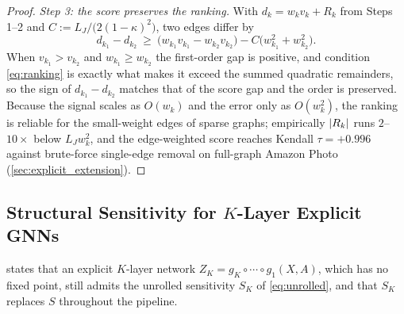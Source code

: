 \begin{proof}
\emph{Step 3: the score preserves the ranking.}
With $d_k=w_k v_k+R_k$ from Steps 1--2 and $C:=L_J/\big(2(1-\kappa)^2\big)$, two edges differ by
\begin{equation}
d_{k_1}-d_{k_2}\ \ge\ \big(w_{k_1}v_{k_1}-w_{k_2}v_{k_2}\big)-C\big(w_{k_1}^2+w_{k_2}^2\big).
\label{eq:rank-gap}
\end{equation}
When $v_{k_1}>v_{k_2}$ and $w_{k_1}\ge w_{k_2}$ the first-order gap is positive, and condition
\eqref{eq:ranking} is exactly what makes it exceed the summed quadratic remainders, so the sign of
$d_{k_1}-d_{k_2}$ matches that of the score gap and the order is preserved. Because the signal scales as
$O(w_k)$ and the error only as $O(w_k^2)$, the ranking is reliable for the small-weight edges of sparse
graphs; empirically $\left|R_k\right|$ runs $2$--$10\times$ below $L_J w_k^2$, and the edge-weighted score
reaches Kendall $\tau=+0.996$ against brute-force single-edge removal on full-graph Amazon Photo
(\cref{sec:explicit_extension}).
\end{proof}

\subsection{Structural Sensitivity for $K$-Layer Explicit GNNs}
\label{app:explicit_prop}

 states that an explicit $K$-layer network
$Z_K=g_K\circ\cdots\circ g_1(X,A)$, which has no fixed point, still admits the unrolled sensitivity
$S_K$ of \cref{eq:unrolled}, and that $S_K$ replaces $S$ throughout the pipeline.

